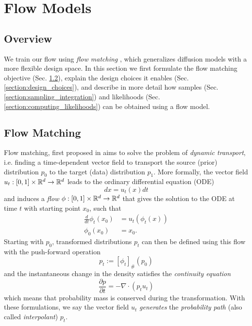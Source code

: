 
\chapter{Flow Models}\label{section:flow_models}

\section{Overview}

We train our flow using \textit{flow matching} \citep{lipmanFlowMatchingGenerative2023,albergoStochasticInterpolantsUnifying2023,liuFlowStraightFast2022}, which generalizes diffusion models with a more flexible design space. In this section we first formulate the flow matching objective (Sec. \ref{section:flow_matching}), explain the design choices it enables (Sec. \ref{section:design_choices}), and describe in more detail how samples (Sec. \ref{section:sampling_integration}) and likelihoods (Sec. \ref{section:computing_likelihoods}) can be obtained using a flow model. 

\section{Flow Matching} \label{section:flow_matching}

Flow matching, first proposed in \citep{lipmanFlowMatchingGenerative2023,albergoStochasticInterpolantsUnifying2023,liuFlowStraightFast2022} aims to solve the problem of \textit{dynamic transport}, i.e. finding a time-dependent vector field to transport the source (prior) distribution $p_0$ to the target (data) distribution $p_1$. More formally, the vector field $u_t: [0,1] \times \mathbb{R}^d \to \mathbb{R}^d$ leads to the ordinary differential equation (ODE)
\begin{equation}
    dx = u_t(x) dt
\end{equation}
and induces a \textit{flow} $\phi: [0,1] \times \mathbb{R}^d \to \mathbb{R}^d$ that gives the solution to the ODE at time $t$ with starting point $x_0$, such that 
\begin{align}
    \frac{d}{dt} \phi_t(x_0) &= u_t(\phi_t(x)) \\
    \phi_0(x_0) &= x_0.
\end{align}
Starting with $p_0$, transformed distributions $p_t$ can then be defined using this flow with the push-forward operation
\begin{equation}
    p_t := [\phi_t]_\# (p_0)
\end{equation} 
and the instantaneous change in the density satisfies the \textit{continuity equation}
\begin{equation}
    \frac{\partial p}{\partial t} = - \nabla \cdot (p_t u_t)
\end{equation}
which means that probability mass is conserved during the transformation. With these formulations, we say the vector field $u_t$ \textit{generates} the \textit{probability path} (also called \textit{interpolant}) $p_t$.

